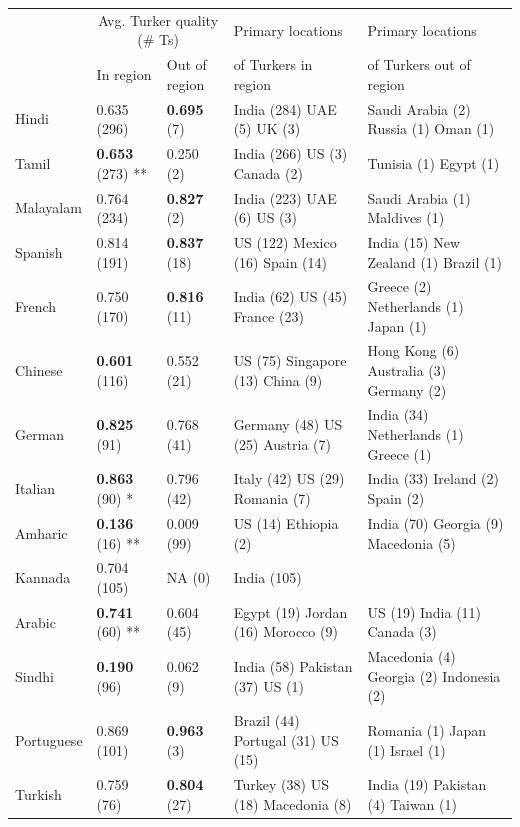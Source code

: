 \documentclass[11pt]{article}
\begin{document}
\begin{table}
\scriptsize
\begin{center}
\begin{tabular}{lllll}
\hline\hline
&\multicolumn{2}{c}{Avg. Turker quality (\# Ts)}&Primary locations&Primary locations\\
&In region&Out of region&of Turkers in region&of Turkers out of region\\
\hline\hline
Hindi & 0.635 (296) & \textbf{0.695} (7) & India (284) UAE (5) UK (3)  & Saudi Arabia (2) Russia (1) Oman (1) \\
Tamil & \textbf{0.653} (273) ** & 0.250 (2) & India (266) US (3) Canada (2)  & Tunisia (1) Egypt (1)  \\
Malayalam & 0.764 (234) & \textbf{0.827} (2) & India (223) UAE (6) US (3)  & Saudi Arabia (1) Maldives (1) \\
Spanish & 0.814 (191) & \textbf{0.837} (18) & US (122) Mexico (16) Spain (14)  & India (15) New Zealand (1) Brazil (1) \\
French & 0.750 (170) & \textbf{0.816} (11) & India (62) US (45) France (23)  & Greece (2) Netherlands (1) Japan (1) \\
Chinese & \textbf{0.601} (116) & 0.552 (21) & US (75) Singapore (13) China (9)  & Hong Kong (6) Australia (3) Germany (2)  \\
German & \textbf{0.825} (91) & 0.768 (41) & Germany (48) US (25) Austria (7)  & India (34) Netherlands (1) Greece (1)  \\
Italian & \textbf{0.863} (90) * & 0.796 (42) & Italy (42) US (29) Romania (7)  & India (33) Ireland (2) Spain (2)  \\
Amharic & \textbf{0.136} (16) ** & 0.009 (99) & US (14) Ethiopia (2)  & India (70) Georgia (9) Macedonia (5)  \\
Kannada & 0.704 (105) & NA (0) & India (105)  & \\
Arabic & \textbf{0.741} (60) ** & 0.604 (45) & Egypt (19) Jordan (16) Morocco (9)  & US (19) India (11) Canada (3)  \\
Sindhi & \textbf{0.190} (96) & 0.062 (9) & India (58) Pakistan (37) US (1)  & Macedonia (4) Georgia (2) Indonesia (2)  \\
Portuguese & 0.869 (101) & \textbf{0.963} (3) & Brazil (44) Portugal (31) US (15)  & Romania (1) Japan (1) Israel (1) \\
Turkish & 0.759 (76) & \textbf{0.804} (27) & Turkey (38) US (18) Macedonia (8)  & India (19) Pakistan (4) Taiwan (1) \\

\end{tabular}
\end{center}
\end{table}
\end{document}
